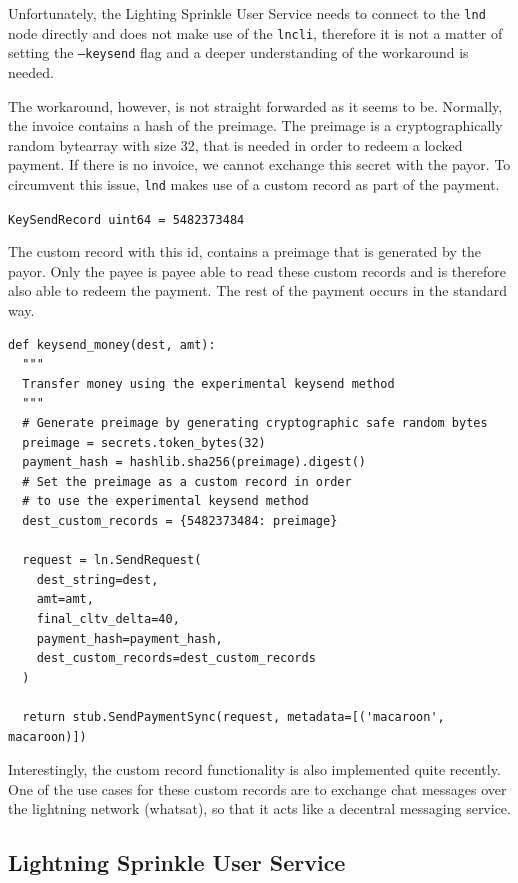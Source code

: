 Unfortunately, the Lighting Sprinkle User Service needs to connect to the \texttt{lnd} node directly and does not make use of the \texttt{lncli}, therefore it is not a matter of setting the \texttt{--keysend} flag and a deeper understanding of the workaround is needed.

The workaround, however, is not straight forwarded as it seems to be. Normally, the invoice contains a hash of the preimage. The preimage is a cryptographically random bytearray with size 32, that is needed in order to redeem a locked payment. If there is no invoice, we cannot exchange this secret with the payor. To circumvent this issue, \texttt{lnd} makes use of a custom record as part of the payment.

\texttt{KeySendRecord uint64 = 5482373484}

The custom record with this id, contains a preimage that is generated by the payor. Only the payee is payee able to read these custom records and is therefore also able to redeem the payment. The rest of the payment occurs in the standard way.
\lstset{language=Python}
\lstset{frame=lines}
\lstset{basicstyle=\footnotesize}
\begin{lstlisting}
def keysend_money(dest, amt):
  """ 
  Transfer money using the experimental keysend method
  """
  # Generate preimage by generating cryptographic safe random bytes
  preimage = secrets.token_bytes(32) 
  payment_hash = hashlib.sha256(preimage).digest()
  # Set the preimage as a custom record in order 
  # to use the experimental keysend method
  dest_custom_records = {5482373484: preimage}

  request = ln.SendRequest(
    dest_string=dest,
    amt=amt,
    final_cltv_delta=40,
    payment_hash=payment_hash,
    dest_custom_records=dest_custom_records
  )
  
  return stub.SendPaymentSync(request, metadata=[('macaroon', macaroon)])

\end{lstlisting}

Interestingly, the custom record functionality is also implemented quite recently. One of the use cases for these custom records are to exchange chat messages over the lightning network (whatsat), so that it acts like a decentral messaging service. 


\subsection{Lightning Sprinkle User Service}

